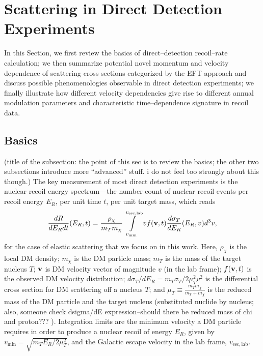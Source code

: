 \documentclass[11pt]{article}
\newcommand{\vgColor}{magenta}
\newcommand{\vg}[1]{{\color{\vgColor} #1}}
\begin{document}
\section{Scattering in Direct Detection Experiments}\label{sec:dd}

In this Section, we first review the basics of direct--detection recoil--rate calculation; we then summarize potential novel momentum and velocity dependence of scattering cross sections categorized by the EFT approach and discuss possible phenomenologies observable in direct detection experiments; we finally illustrate how different velocity dependencies give rise to different annual modulation parameters and characteristic time--dependence signature in recoil data.
\subsection{Basics}

\vg{(title of the subsection: the point of this sec is to review the basics; the other two subsections introduce more ``advanced'' stuff. i do not feel too strongly about this though.)} The key measurement of most direct detection experiments is the nuclear recoil energy spectrum---the number count of nuclear recoil events per recoil energy $E_R$, per unit time $t$, per unit target mass, which reads
\begin{equation}
\frac{dR}{dE_R dt}(E_R,t) =  \frac{\rho_\chi}{m_T m_\chi} \int\limits_{v_{\mathrm{min}}}^{v_{\mathrm{esc, lab}}}  v f(\mathrm{\mbox{\bf{v}}},t) \frac{d\sigma_T}{dE_R} (E_R,v) d^3v ,
\label{eq:dRdEr_general}
\end{equation}
for the case of elastic scattering that we focus on in this work. Here, $\rho_\chi$ is the local DM density; $m_\chi$ is the DM particle mass; $m_T$ is the mass of the target nucleus $T$; $\mathrm{\mbox{\bf{v}}}$ is DM velocity vector of magnitude $v$ (in the lab frame); $f(\mathrm{\mbox{\bf{v}}}, t)$ is the observed DM velocity distribution; $d\sigma_T/dE_R=m_T \sigma_T /2\mu_T^2 v^2$ is the differential cross section for DM scattering off a nucleus $T$; and $\mu_T\equiv\frac{m_Tm_\chi}{m_T+m_\chi}$ is the reduced mass of the DM particle and the target nucleus \vg{(substituted nuclide by nucleus; also, someone check dsigma/dE expression--should there be reduced mass of chi and proton??? )}. Integration limits are the minimum velocity a DM particle requires in order to produce a nuclear recoil of energy $E_R$, given by $v_\mathrm{min} = \sqrt{m_T E_R/2\mu_T^2}$, and the Galactic escape velocity in the lab frame, $v_{\mathrm{esc, lab}}$.
\end{document}
